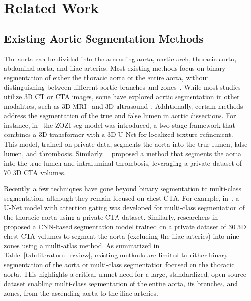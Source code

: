 \section{Related Work}
\label{sect:prior-work}
\subsection{Existing Aortic Segmentation Methods}
\label{sect:related-work}

The aorta can be divided into the ascending aorta, aortic arch, thoracic aorta, abdominal aorta, and iliac arteries. Most existing methods focus on binary segmentation of either the thoracic aorta or the entire aorta, without distinguishing between different aortic branches and zones~\citep{lyu2021dissected, lin2023deformable, de2022quantification, sieren2022automated, comelli2021deep, zhao2022segmentation}. While most studies utilize 3D CT or CTA images, some have explored aortic segmentation in other modalities, such as 3D MRI~\cite{manokaran2023fully, guo2024deep, berhane2020fully, marin20234d} and 3D ultrasound~\citep{maas2024automatic}. Additionally, certain methods address the segmentation of the true and false lumen in aortic dissections. For instance, in~\citep{jung2024zozi} the ZOZI-seg model was introduced, a two-stage framework that combines a 3D transformer with a 3D U-Net for localized texture refinement. This model, trained on private data, segments the aorta into the true lumen, false lumen, and thrombosis. Similarly, ~\cite{mu2023automatic} proposed a method that segments the aorta into the true lumen and intraluminal thrombosis, leveraging a private dataset of 70 3D CTA volumes. 

Recently, a few techniques have gone beyond binary segmentation to multi-class segmentation, although they remain focused on chest CTA. For example, in~\citep{zhong2021segmentation}, a U-Net model with attention gating was developed for multi-class segmentation of the thoracic aorta using a private CTA dataset. Similarly, researchers in~\citep{koo2024deep} proposed a CNN-based segmentation model trained on a private dataset of 30 3D chest CTA volumes to segment the aorta (excluding the iliac arteries) into nine zones using a multi-atlas method. As summarized in Table~\ref{tab:literature_review}, existing methods are limited to either binary segmentation of the aorta or multi-class segmentation focused on the thoracic aorta. This highlights a critical unmet need for a large, standardized, open-source dataset enabling multi-class segmentation of the entire aorta, its branches, and zones, from the ascending aorta to the iliac arteries.

